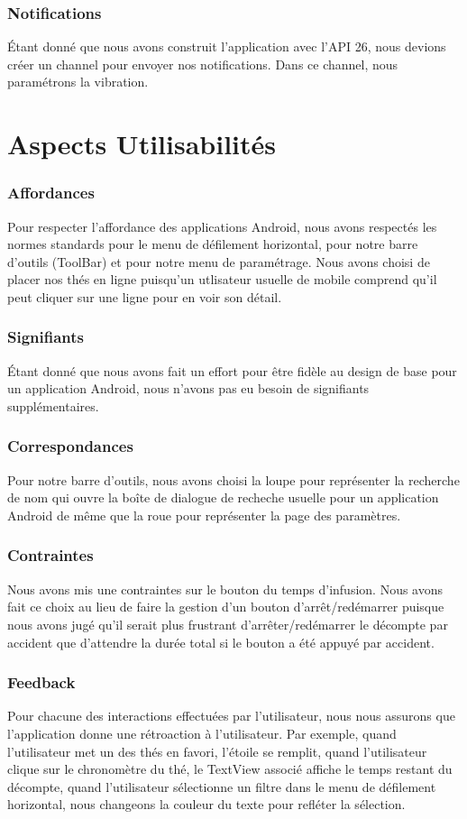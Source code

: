 \documentclass[a4paper,12pt]{article}
\begin{document}
\begin{spacing}{1}
	\subsubsection*{Notifications}
	Étant donné que nous avons construit l'application avec l'API 26, nous devions créer un channel pour envoyer nos notifications. Dans ce channel, nous paramétrons la vibration.
	\newpage
	\section*{Aspects Utilisabilités}
	\subsubsection*{Affordances}
	Pour respecter l'affordance des applications Android, nous avons respectés les normes standards pour le menu de défilement horizontal, pour notre barre d'outils (ToolBar) et pour notre menu de paramétrage. Nous avons choisi de placer nos thés en ligne puisqu'un utlisateur usuelle de mobile comprend qu'il peut cliquer sur une ligne pour en voir son détail.
	\subsubsection*{Signifiants}
	Étant donné que nous avons fait un effort pour être fidèle au design de base pour un application Android, nous n'avons pas eu besoin de signifiants supplémentaires.
	\subsubsection*{Correspondances}
	Pour notre barre d'outils, nous avons choisi la loupe pour représenter la recherche de nom qui ouvre la boîte de dialogue de recheche usuelle pour un application Android de même que la roue pour représenter la page des paramètres.
	\subsubsection*{Contraintes}
	Nous avons mis une contraintes sur le bouton du temps d'infusion. Nous avons fait ce choix au lieu de faire la gestion d'un bouton d'arrêt/redémarrer puisque nous avons jugé qu'il serait plus frustrant d'arrêter/redémarrer le décompte par accident que d'attendre la durée total si le bouton a été appuyé par accident.
	\subsubsection*{Feedback}
	Pour chacune des interactions effectuées par l'utilisateur, nous nous assurons que l'application donne une rétroaction à l'utilisateur. Par exemple, quand l'utilisateur met un des thés en favori, l'étoile se remplit, quand l'utilisateur clique sur le chronomètre du thé, le TextView associé affiche le temps restant du décompte, quand l'utilisateur sélectionne un filtre dans le menu de défilement horizontal, nous changeons la couleur du texte pour refléter la sélection.

\end{spacing}
\end{document}
